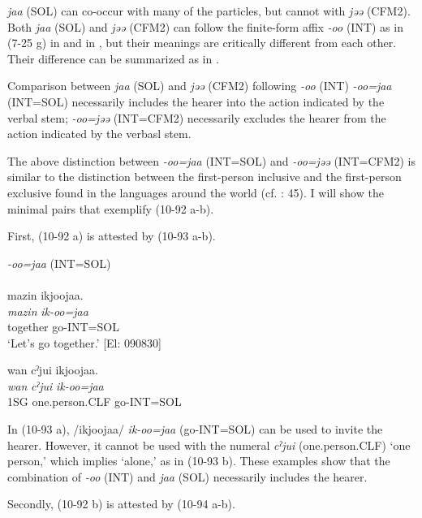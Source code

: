 \begin{xlist}
\textit{jaa} (SOL) can co-occur with many of the particles, but cannot with \textit{jəə} (CFM2). Both \textit{jaa} (SOL) and \textit{jəə} (CFM2) can follow the finite-form affix \textit{-oo} (INT) as in (7-25 g) in  and  in , but their meanings are critically different from each other. Their difference can be summarized as in .

\ea\label{ex:10.92}
Comparison between \textit{jaa} (SOL) and \textit{jəə} (CFM2) following \textit{{}-oo} (INT)
  \ea \textit{{}-oo=jaa} (INT=SOL) necessarily includes the hearer into the action indicated by the verbal stem;
  \ex \textit{{}-oo=jəə} (INT=CFM2) necessarily excludes the hearer from the action indicated by the verbasl stem.
  \z
\z

The above distinction between \textit{{}-oo=jaa} (INT=SOL) and \textit{{}-oo=jəə} (INT=CFM2) is similar to the distinction between the first-person inclusive and the first-person exclusive found in the languages around the world (cf. \citealt{Payne1997}: 45). I will show the minimal pairs that exemplify (10-92 a-b).

First, (10-92 a) is attested by (10-93 a-b).

\ea\label{ex:10.93}   \textit{{}-oo=jaa} (INT=SOL)\\
  \ea{}\\
      \glll     mazin  ikjoojaa.\\
       \textit{mazin}  \textit{ik-oo=jaa}\\
       together  go-INT=SOL\\
      \glt       ‘Let’s go together.’ [El: 090830]

  \ex  %
      \glll    *wan  cˀjui  ikjoojaa.\\
       \textit{wan}  \textit{cˀjui}  \textit{ik-oo=jaa}\\
       1SG  one.person.CLF  go-INT=SOL\\
       \glt    [El: 090830]
    \z
\z

In (10-93 a), /ikjoojaa/ \textit{ik-oo=jaa} (go-INT=SOL) can be used to invite the hearer. However, it cannot be used with the numeral \textit{cˀjui} (one.person.CLF) ‘one person,’ which implies ‘alone,’ as in (10-93 b). These examples show that the combination of \textit{{}-}\textit{oo} (INT) and \textit{jaa} (SOL) necessarily includes the hearer.

Secondly, (10-92 b) is attested by (10-94 a-b).


\end{xlist}
